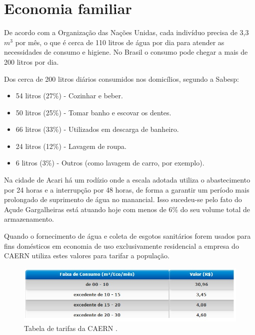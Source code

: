   \section{Economia familiar}
   
      De acordo com a Organização das Nações Unidas, cada indivíduo precisa de 3,3 $m^3$ por mês, o que é cerca de 110
      litros de água por dia para atender as necessidades de consumo e higiene. No Brasil o consumo pode chegar a mais
      de 200 litros por dia.
      
      Dos cerca de 200 litros diários consumidos nos domicílios, segundo a Sabesp:
      \begin{itemize}
	\item 54 litros (27\%) - Cozinhar e beber.
	\item 50 litros (25\%) - Tomar banho e escovar os dentes.
	\item 66 litros (33\%) - Utilizados em descarga de banheiro.
	\item 24 litros (12\%) - Lavagem de roupa.
	\item 6 litros (3\%) - Outros (como lavagem de carro, por exemplo).
      \end{itemize}
      
      Na cidade de Acari há um rodízio onde a escala adotada utiliza o abastecimento por 24 horas e a interrupção por 48 horas,
      de forma a garantir um período mais prolongado de suprimento de água no manancial. Isso sucedeu-se pelo fato do Açude
      Gargalheiras está atuando hoje com menos de 6\% do seu volume total de armazenamento.
      
      Quando o fornecimento de água e coleta de esgotos sanitários forem usados para fins domésticos em economia de uso
      exclusivamente residencial a empresa do CAERN utiliza estes valores para tarifar a população.
      
      \FloatBarrier
      \begin{figure}[!h]
	  \centering
	  \includegraphics[scale = 0.9]{editaveis/figuras/custo_caern}
	  \caption[Tabela de tarifas da CAERN]{Tabela de tarifas da CAERN \footnotemark.}
	  \label{custo_caern}
      \end{figure}
      \FloatBarrier
      
